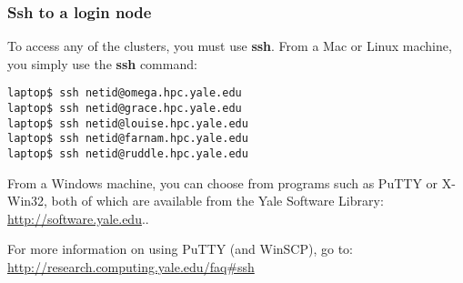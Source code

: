 \documentclass[10pt]{beamer}
\begin{document}
\begin{frame}[fragile]
\frametitle{Ssh to a login node}
To access any of the clusters, you must use \textbf{ssh}.
From a Mac or Linux machine, you simply use the \textbf{ssh} command:

\begin{verbatim}
laptop$ ssh netid@omega.hpc.yale.edu
laptop$ ssh netid@grace.hpc.yale.edu
laptop$ ssh netid@louise.hpc.yale.edu
laptop$ ssh netid@farnam.hpc.yale.edu
laptop$ ssh netid@ruddle.hpc.yale.edu
\end{verbatim}

From a Windows machine, you can choose from programs such as PuTTY or
X-Win32, both of which are available from the Yale Software Library:
\url{http://software.yale.edu}..

\vskip10pt
For more information on using PuTTY (and WinSCP), go to:
\url{http://research.computing.yale.edu/faq\#ssh}
\end{frame}
\end{document}

